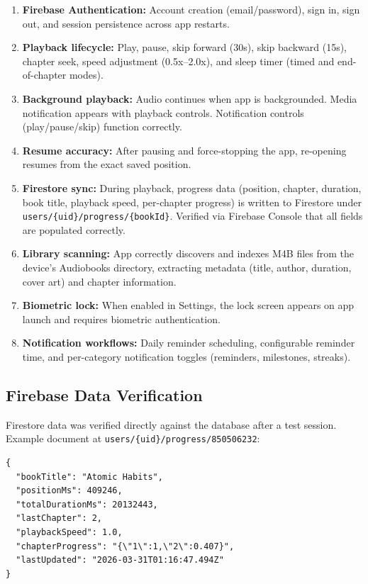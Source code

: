 \documentclass[11pt,a4paper]{article}
\begin{document}
\begin{enumerate}[noitemsep]
    \item \textbf{Firebase Authentication:} Account creation (email/password), sign in, sign out, and session persistence across app restarts.
    \item \textbf{Playback lifecycle:} Play, pause, skip forward (30s), skip backward (15s), chapter seek, speed adjustment (0.5x--2.0x), and sleep timer (timed and end-of-chapter modes).
    \item \textbf{Background playback:} Audio continues when app is backgrounded. Media notification appears with playback controls. Notification controls (play/pause/skip) function correctly.
    \item \textbf{Resume accuracy:} After pausing and force-stopping the app, re-opening resumes from the exact saved position.
    \item \textbf{Firestore sync:} During playback, progress data (position, chapter, duration, book title, playback speed, per-chapter progress) is written to Firestore under \texttt{users/\{uid\}/progress/\{bookId\}}. Verified via Firebase Console that all fields are populated correctly.
    \item \textbf{Library scanning:} App correctly discovers and indexes M4B files from the device's Audiobooks directory, extracting metadata (title, author, duration, cover art) and chapter information.
    \item \textbf{Biometric lock:} When enabled in Settings, the lock screen appears on app launch and requires biometric authentication.
    \item \textbf{Notification workflows:} Daily reminder scheduling, configurable reminder time, and per-category notification toggles (reminders, milestones, streaks).
\end{enumerate}

\subsection{Firebase Data Verification}

Firestore data was verified directly against the database after a test session. Example document at \texttt{users/\{uid\}/progress/850506232}:

\begin{lstlisting}
{
  "bookTitle": "Atomic Habits",
  "positionMs": 409246,
  "totalDurationMs": 20132443,
  "lastChapter": 2,
  "playbackSpeed": 1.0,
  "chapterProgress": "{\"1\":1,\"2\":0.407}",
  "lastUpdated": "2026-03-31T01:16:47.494Z"
}
\end{lstlisting}
\end{document}
